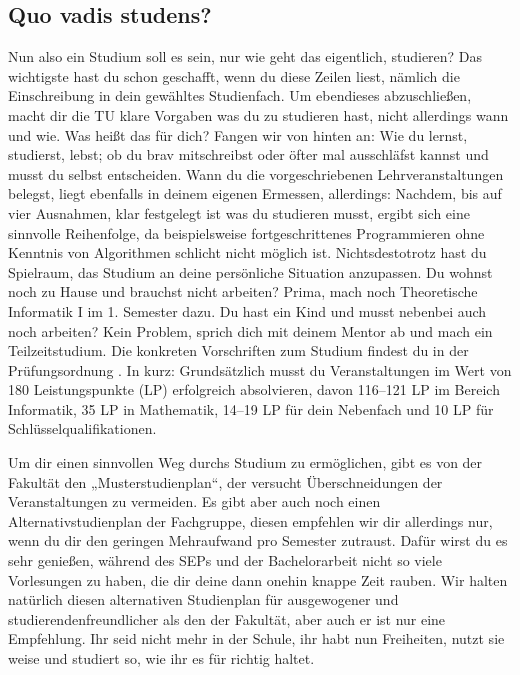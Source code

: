\subsection{Quo vadis studens?}

Nun also ein Studium soll es sein, nur wie geht das eigentlich, studieren?
Das wichtigste hast du schon geschafft, wenn du diese Zeilen liest, nämlich die Einschreibung in dein gewähltes Studienfach.
Um ebendieses abzuschließen, macht dir die TU klare Vorgaben was du zu studieren hast, nicht allerdings wann und wie. Was heißt das für dich?
Fangen wir von hinten an:
Wie du lernst, studierst, lebst; ob du brav mitschreibst oder öfter mal ausschläfst kannst und musst du selbst entscheiden.
Wann du die vorgeschriebenen Lehrveranstaltungen belegst, liegt ebenfalls in deinem eigenen Ermessen, allerdings:
Nachdem, bis auf vier Ausnahmen, klar festgelegt ist was du studieren musst, ergibt sich eine sinnvolle Reihenfolge, da beispielsweise fortgeschrittenes Programmieren ohne Kenntnis von Algorithmen schlicht nicht möglich ist. Nichtsdestotrotz hast du Spielraum, das Studium an deine persönliche Situation anzupassen.
Du wohnst noch zu Hause und brauchst nicht arbeiten? Prima, mach noch Theoretische Informatik I im 1. Semester dazu.
Du hast ein Kind und musst nebenbei auch noch arbeiten? Kein Problem, sprich dich mit deinem Mentor ab und mach ein Teilzeitstudium.
Die konkreten Vorschriften zum Studium findest du in der Prüfungsordnung
.
In kurz: Grundsätzlich musst du Veranstaltungen im Wert von 180 Leistungspunkte (LP) erfolgreich absolvieren, davon 116–121 LP im Bereich Informatik, 35 LP in Mathematik, 14–19 LP für dein Nebenfach und 10 LP für Schlüsselqualifikationen.

Um dir einen sinnvollen Weg durchs Studium zu ermöglichen, gibt es von der Fakultät den „Musterstudienplan“, der versucht Überschneidungen der Veranstaltungen zu vermeiden.
Es gibt aber auch noch einen Alternativstudienplan der Fachgruppe, diesen empfehlen wir dir allerdings nur, wenn du dir den geringen Mehraufwand pro Semester zutraust. Dafür wirst du es sehr genießen, während des SEPs und der Bachelorarbeit nicht so viele Vorlesungen zu haben, die dir deine dann onehin knappe Zeit rauben.
Wir halten natürlich diesen alternativen Studienplan für ausgewogener und studierendenfreundlicher als den der Fakultät, aber auch er ist nur eine Empfehlung.
Ihr seid nicht mehr in der Schule, ihr habt nun Freiheiten, nutzt sie weise und studiert so, wie ihr es für richtig haltet.




